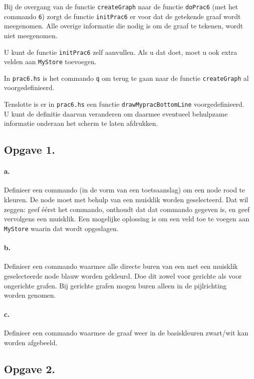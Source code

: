 \documentclass[11pt]{article}
\begin{document}
Bij de overgang van de functie \verb!createGraph! naar de functie
\verb!doPrac6! (met het commando \verb!6!) zorgt de functie \verb!initPrac6!
er voor dat de getekende graaf wordt meegenomen.
Alle overige informatie die nodig is om de graaf te tekenen, wordt niet
meegenomen.

U kunt de functie \verb!initPrac6! zelf aanvullen. 
Als u dat doet, moet u ook extra velden aan \verb!MyStore! toevoegen.

In \verb!prac6.hs! is het commando \verb!q! om terug te gaan naar de
functie \verb!createGraph! al voorgedefinieerd.

Tenslotte is er in \verb!prac6.hs! een functie \verb!drawMypracBottomLine!
voor\-ge\-de\-fi\-nieerd.
U kunt de definitie daarvan veranderen om daarmee eventueel behulpzame
informatie onderaan het scherm te laten afdrukken.

\subsection*{Opgave 1.}

\paragraph{a.}
Definieer een commando (in de vorm van een toetsaanslag) om een
node rood te kleuren.
De node moet met behulp van een muisklik worden geselecteerd.
Dat wil zeggen: geef \'e\'erst het commando, onthoudt dat dat commando 
gegeven is, en geef vervolgens een muisklik.
Een mogelijke oplossing is om een veld toe te voegen aan \verb!MyStore!
waarin dat wordt opgeslagen.

\paragraph{b.}
Definieer een commando waarmee alle directe buren van een met een muisklik
geselecteerde node blauw worden gekleurd.
Doe dit zowel voor gerichte als voor ongerichte grafen.
Bij gerichte grafen mogen buren alleen in de pijlrichting worden genomen.

\paragraph{c.}
Definieer een commando waarmee de graaf weer in de basiskleuren zwart/wit
kan worden afgebeeld.


\subsection*{Opgave 2.}
\end{document}
